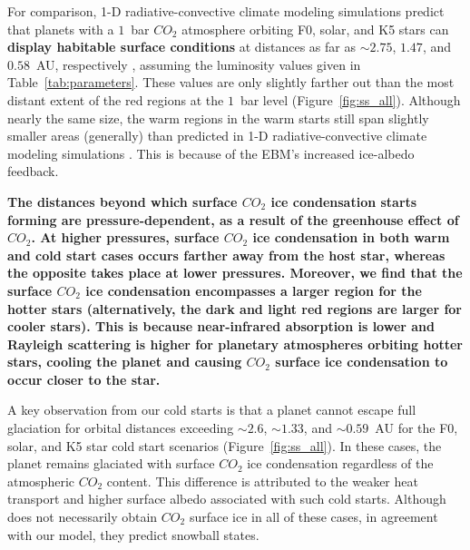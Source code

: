 \documentclass[fleqn,usenatbib]{mnras}
\providecommand{\DIFadd}[1]{{\bf #1}} %
\providecommand{\DIFdel}[1]{} %
\providecommand{\DIFaddbegin}{} %
\providecommand{\DIFaddend}{} %
\providecommand{\DIFdelbegin}{} %
\providecommand{\DIFdelend}{} %
\newcommand{\DIFscaledelfig}{0.5}
\newlength{\DIFdelgraphicswidth} %
\newlength{\DIFdelgraphicsheight} %
\newcommand{\DIFaddincludegraphics}[2][]{{\color{blue}\fbox{\DIFOincludegraphics[#1]{#2}}}} %
\newcommand{\DIFdelincludegraphics}[2][]{%
\sbox{\DIFdelgraphicsbox}{\DIFOincludegraphics[#1]{#2}}%
\settoboxwidth{\DIFdelgraphicswidth}{\DIFdelgraphicsbox} %
\settoboxtotalheight{\DIFdelgraphicsheight}{\DIFdelgraphicsbox} %
\scalebox{\DIFscaledelfig}{%
\parbox[b]{\DIFdelgraphicswidth}{\usebox{\DIFdelgraphicsbox}\\[-\baselineskip] \rule{\DIFdelgraphicswidth}{0em}}\llap{\resizebox{\DIFdelgraphicswidth}{\DIFdelgraphicsheight}{%
\setlength{\unitlength}{\DIFdelgraphicswidth}%
\begin{picture}(1,1)%
\thicklines\linethickness{2pt} %
{\color[rgb]{1,0,0}\put(0,0){\framebox(1,1){}}}%
{\color[rgb]{1,0,0}\put(0,0){\line( 1,1){1}}}%
{\color[rgb]{1,0,0}\put(0,1){\line(1,-1){1}}}%
\end{picture}%
}\hspace*{3pt}}} %
} %
\DeclareRobustCommand{\DIFaddbegin}{\DIFOaddbegin \let\includegraphics\DIFaddincludegraphics} %
\DeclareRobustCommand{\DIFaddend}{\DIFOaddend \let\includegraphics\DIFOincludegraphics} %
\DeclareRobustCommand{\DIFdelbegin}{\DIFOdelbegin \let\includegraphics\DIFdelincludegraphics} %
\DeclareRobustCommand{\DIFdelend}{\DIFOaddend \let\includegraphics\DIFOincludegraphics} %
\begin{document}
\DIFdel{Moreover, the surface $CO_{\mathrm{2}}$ ice condensation encompasses a larger region for the hotter stars (alternatively, the red region is larger for cooler stars). This is because near-infrared absorption is lower and Rayleigh scattering is higher for planetary atmospheres orbiting hotter stars, cooling the planet and causing $CO_{\mathrm{2}}$ surface ice condensation to occur closer to the star. }\DIFdelend For comparison, 1-D radiative-convective climate modeling simulations predict that planets with a $1$~bar $CO_{\mathrm{2}}$ atmosphere orbiting F0, solar, and K5 stars can \DIFdelbegin \DIFdel{remain habitable }\DIFdelend \DIFaddbegin \DIFadd{display habitable surface conditions }\DIFaddend at distances as far as $\sim 2.75$, $1.47$, and $0.58$~AU, respectively \citep{kasting1993, KumarKopparapu2013,Ramirez2018}, assuming the luminosity values given in Table~\ref{tab:parameters}. These values are only slightly farther out than the most distant extent of the red regions at the $1$~bar level (Figure~\ref{fig:ss_all}). Although nearly the same size, the warm regions in the warm starts still span slightly smaller areas (generally) than predicted in 1-D radiative-convective climate modeling simulations \citep{kasting1993, KumarKopparapu2013,Ramirez2018}. This is because of the EBM's increased ice-albedo feedback.

\DIFaddbegin \DIFadd{The distances beyond which surface $CO_{\mathrm{2}}$ ice condensation starts forming are pressure-dependent, as a result of the greenhouse effect of $CO_{\mathrm{2}}$. At higher pressures, surface $CO_{\mathrm{2}}$ ice condensation in both warm and cold start cases occurs farther away from the host star, whereas the opposite takes place at lower pressures. Moreover, we find that the surface $CO_{\mathrm{2}}$ ice condensation encompasses a larger region for the hotter stars (alternatively, the dark and light red regions are larger for cooler stars). This is because near-infrared absorption is lower and Rayleigh scattering is higher for planetary atmospheres orbiting hotter stars, cooling the planet and causing $CO_{\mathrm{2}}$ surface ice condensation to occur closer to the star.
}

\DIFaddend A key observation from our cold starts is that a planet cannot escape full glaciation for orbital distances exceeding \DIFdelbegin \DIFdel{$\sim 2.55$}\DIFdelend \DIFaddbegin \DIFadd{$\sim 2.6$}\DIFaddend , $\sim1.33$, and \DIFdelbegin \DIFdel{$\sim0.58$}\DIFdelend \DIFaddbegin \DIFadd{$\sim0.59$}\DIFaddend ~AU for the F0, solar, and K5 star cold start scenarios (Figure~\ref{fig:ss_all}). In these cases, the planet remains glaciated with surface $CO_{\mathrm{2}}$ ice condensation regardless of the atmospheric $CO_{\mathrm{2}}$ content\DIFdelbegin \DIFdel{(Figure~\ref{fig:ss_all})}\DIFdelend . This difference is attributed to the weaker heat transport and higher surface albedo associated with such cold starts. Although \citet{Turbet2017} does not necessarily obtain $CO_{\mathrm{2}}$ surface ice in all of these cases, in agreement with our model, they predict snowball states. 
\DIFdelbegin %
\end{document}
